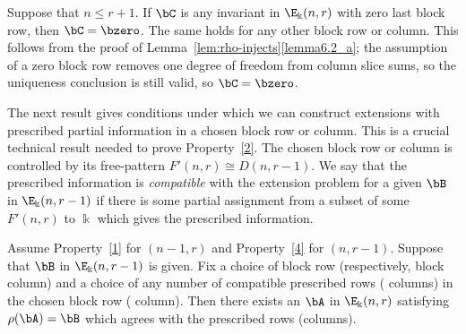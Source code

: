 \begin{rema}\label{rmk:sharper}
 Suppose that $n \le r+1$. If $\bC$ is any invariant in
 $\E_\Bbbk(n,r)$ with zero last block row, then $\bC = \bzero$. The
 same holds for any other block row or column. This follows from the
 proof of Lemma~\ref{lem:rho-injects}\ref{lemma6.2_a}; the assumption of a zero
 block row removes one degree of freedom from column slice sums, so
 the uniqueness conclusion is still valid, so $\bC=\bzero$.
\end{rema}

The next result gives conditions under which we can construct
extensions with prescribed partial information in a chosen block row
or column. This is a crucial technical result needed to prove
Property~\ref{2}. The chosen block row or column is controlled by its
free-pattern $F'(n,r) \cong D(n,r-1)$. We say that the prescribed
information is \emph{compatible} with the extension problem for a
given $\bB$ in $\E_\Bbbk(n,r-1)$ if there is some partial assignment
from a subset of some $F'(n,r)$ to $\Bbbk$ which gives the prescribed
information.



\begin{lemm}\label{lem:partial}
Assume Property~\ref{1} for $(n-1,r)$ and Property~\ref{4} for
$(n,r-1)$. Suppose that $\bB$ in $\E_\Bbbk(n,r-1)$ is given. Fix a
choice of block row \textup{(}respectively, block column\textup{)} and
a choice of any number of compatible prescribed rows \textup{(}\resp
columns\textup{)} in the chosen block row \textup{(}\resp
column\textup{)}. Then there exists an $\bA$ in $\E_\Bbbk(n,r)$
satisfying $\rho(\bA)=\bB$ which agrees with the prescribed rows
\textup{(}\resp columns\textup{)}.
\end{lemm}

